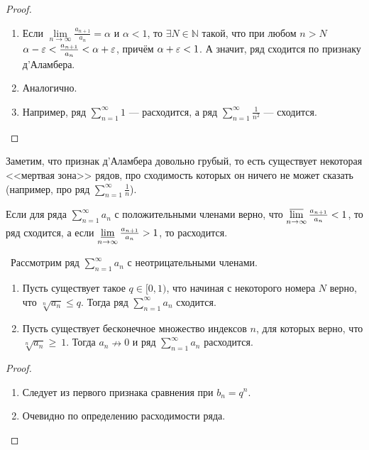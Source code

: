\documentclass[a4paper, 12pt]{article}
\begin{document}
\begin{proof}
	\ 
	\begin{enumerate}
		\item 	Если $\lim\limits_{n\rightarrow\infty} \frac{a_{n+1}}{a_n} = \alpha$ и $\alpha < 1$, то $\exists N \in \mathbb{N}$ такой, что при любом $n > N$ $\alpha-\varepsilon<\frac{a_{n+1}}{a_n} < \alpha+\varepsilon$, причём $\alpha+\varepsilon <1$. А значит, ряд сходится по признаку д'Аламбера.
		\item Аналогично.
		\item Например, ряд $\sum\limits_{n=1}^{\infty} 1$ --- расходится, а ряд $\sum\limits_{n=1}^{\infty} \frac{1}{n^2}$ --- сходится. 

	\end{enumerate}
\end{proof}
Заметим, что признак д'Аламбера довольно грубый, то есть существует некоторая <<мертвая зона>> рядов, про сходимость которых он ничего не может сказать (например, про ряд  $\sum\limits_{n=1}^{\infty} \frac{1}{n}$).

\begin{Consequence}
	Если для ряда $\sum\limits_{n=1}^{\infty} a_n$ с положительными членами верно, что $\varlimsup\limits_{n\rightarrow \infty} \frac{a_{n+1}}{a_{n}} < 1$, то ряд сходится, а если $\varliminf\limits_{n \rightarrow \infty} \frac{a_{n+1}}{a_{n}} > 1$, то расходится.
\end{Consequence}

\begin{Test}\ 
Рассмотрим ряд $\sum\limits_{n=1}^{\infty} a_n$ с неотрицательными членами.
	\begin{enumerate}
		\item 	Пусть существует такое $q \in [0, 1)$, что начиная с некоторого номера $N$ верно, что $\sqrt[n]{{{a_n}}} \leqslant q$. Тогда ряд $\sum\limits_{n=1}^{\infty} a_n$ сходится.
		\item 	Пусть существует бесконечное множество индексов $n$, для которых верно, что  $\sqrt[n]{{{a_n}}} \geqslant~1$. Тогда $a_n \nrightarrow 0$ и ряд $\sum\limits_{n=1}^{\infty} a_n $ расходится.
	\end{enumerate}
\end{Test}

\begin{proof}
	\ 
	\begin{enumerate}
		\item 	Следует из первого признака сравнения при $b_n = q^n$. 
		\item Очевидно по определению расходимости ряда.
	\end{enumerate}
\end{proof}
\end{document}
